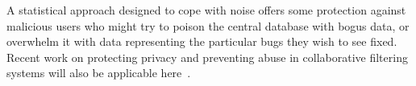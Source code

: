 A statistical approach designed to cope with noise offers some
protection against malicious users who might try to poison the central
database with bogus data, or overwhelm it with data representing the
particular bugs they wish to see fixed.  Recent work on protecting
privacy and preventing abuse in collaborative filtering systems will
also be applicable here~\cite{Canny2002,EC00*150}.

